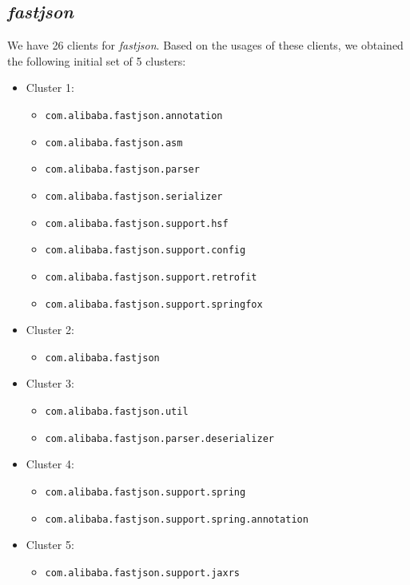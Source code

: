 \subsection{\emph{fastjson}}
\label{sec:fastjson-fission}

We have 26 clients for \emph{fastjson}. Based on the usages of these clients, we obtained the following initial set of 5 clusters:
\begin{itemize}
\item Cluster 1:
\begin{itemize}
\item \texttt{com.alibaba.fastjson.annotation}
\item \texttt{com.alibaba.fastjson.asm}
\item \texttt{com.alibaba.fastjson.parser}
\item \texttt{com.alibaba.fastjson.serializer}
\item \texttt{com.alibaba.fastjson.support.hsf}
\item \texttt{com.alibaba.fastjson.support.config}
\item \texttt{com.alibaba.fastjson.support.retrofit}
\item \texttt{com.alibaba.fastjson.support.springfox}
\end{itemize}
\item Cluster 2:
\begin{itemize}
\item \texttt{com.alibaba.fastjson}
\end{itemize}
\item Cluster 3:
\begin{itemize}
\item \texttt{com.alibaba.fastjson.util}
\item \texttt{com.alibaba.fastjson.parser.deserializer}
\end{itemize}
\item Cluster 4:
\begin{itemize}
\item \texttt{com.alibaba.fastjson.support.spring}
\item \texttt{com.alibaba.fastjson.support.spring.annotation}
\end{itemize}
\item Cluster 5:
\begin{itemize}
\item \texttt{com.alibaba.fastjson.support.jaxrs}
\end{itemize}
\end{itemize}

